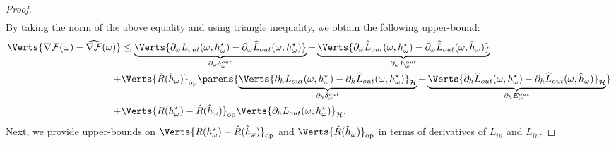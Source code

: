 \begin{proof}
\begin{align*}
    \end{align*}
By taking the norm of the above equality and using triangle inequality, we obtain the following upper-bound: 
    \begin{align}
    \begin{split}
        \Verts{\nabla\mathcal{F}(\omega)-\widehat{\nabla\mathcal{F}}(\omega)}
        & \leq
        \underbrace{\Verts{\partial_\omega L_{out}(\omega,h^\star_\omega)-\partial_\omega \widehat{L}_{out}(\omega,h^\star_\omega)}}_{\Doutw}+\underbrace{\Verts{\partial_\omega \widehat{L}_{out}(\omega,h^\star_\omega)-\partial_\omega \widehat{L}_{out}(\omega,\hat{h}_\omega)}}_{\Eoutw}\\
        +&\Verts{\hat{R}(\hat{h}_{\omega})}_{\op}\parens{\underbrace{\Verts{\partial_h L_{out}(\omega,h^\star_\omega)-\partial_h\widehat{L}_{out}(\omega,h^\star_\omega)}_{\mathcal{H}}}_{\Douth} + \underbrace{\Verts{\partial_h\widehat{L}_{out}(\omega,h^\star_\omega)-\partial_h\widehat{L}_{out}(\omega,\hat{h}_\omega)}_{\mathcal{H}}}_{\Eouth}}\\
                +& \Verts{R(h^\star_\omega)-\hat{R}(\hat{h}_\omega)}_{\op}\Verts{\partial_h L_{out}(\omega,h^\star_\omega)}_{\mathcal{H}}.
                \end{split}\label{eq:diff_grad_inter}
    \end{align}
    Next, we provide upper-bounds on $\Verts{R(h_{\omega}^{\star})- \hat{R}(\hat{h}_{\omega})}_{\op}$ and $\Verts{\hat{R}(\hat{h}_{\omega})}_{\op}$ in terms of derivatives of $L_{in}$ and $\widehat{L}_{in}$. 


\end{proof}
